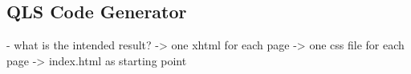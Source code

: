 \subsection{QLS Code Generator}

- what is the intended result?
	-> one xhtml for each page
	-> one css file for each page
	-> index.html as starting point
